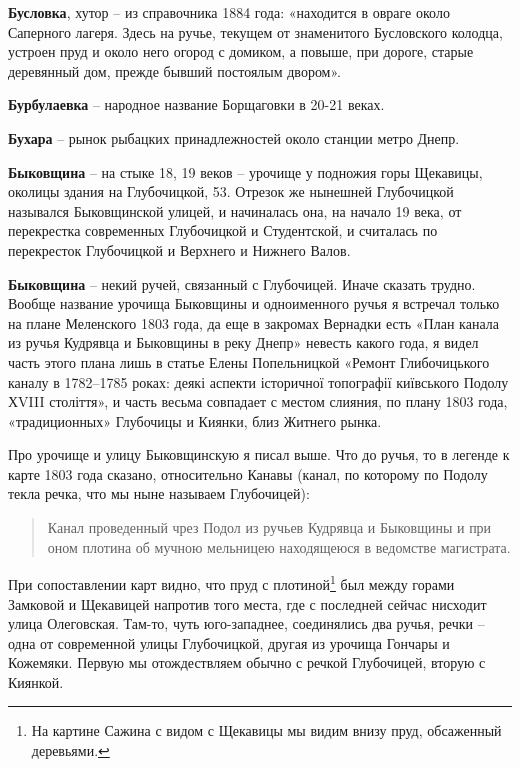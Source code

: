 \medskip

\textbf{Бусловка}, хутор – из справочника 1884 года: «находится в овраге около Саперного лагеря. Здесь на ручье, текущем от знаменитого Бусловского колодца, устроен пруд и около него огород с домиком, а повыше, при дороге, старые деревянный дом, прежде бывший постоялым двором».\\
\medskip


\textbf{Бурбулаевка} – народное название Борщаговки в 20-21 веках.\\

\medskip


\textbf{Бухара} – рынок рыбацких принадлежностей около станции метро Днепр.\\

\medskip

\textbf{Быковщина} – на стыке 18, 19 веков – урочище у подножия горы Щекавицы, околицы здания на Глубочицкой, 53. Отрезок же нынешней Глубочицкой назывался Быковщинской улицей, и начиналась она, на начало 19 века, от перекрестка современных Глубочицкой и Студентской, и считалась по перекресток Глубочицкой и Верхнего и Нижнего Валов.\\

\medskip

\textbf{Быковщина} – некий ручей, связанный с Глубочицей. Иначе сказать трудно. Вообще название урочища Быковщины и одноименного ручья я встречал только на плане Меленского 1803 года, да еще в закромах Вернадки есть «План канала из ручья Кудрявца и Быковщины в реку Днепр» невесть какого года, я видел часть этого плана лишь в статье Елены Попельницкой «Ремонт Глибочицького каналу в 1782–1785 роках: деякі аспекти історичної топографії київського Подолу ХVIII століття», и часть весьма совпадает с местом слияния, по плану 1803 года, «традиционных» Глубочицы и Киянки, близ Житнего рынка.

Про урочище и улицу Быковщинскую я писал выше. Что до ручья, то в легенде к карте 1803 года сказано, относительно Канавы (канал, по которому по Подолу текла речка, что мы ныне называем Глубочицей):

\begin{quotation}
Канал проведенный чрез Подол из ручьев Кудрявца и Быковщины и при оном плотина об мучною мельницею находящеюся в ведомстве магистрата.
\end{quotation}

При сопоставлении карт видно, что пруд с плотиной\footnote{На картине Сажина с видом с Щекавицы мы видим внизу пруд, обсаженный деревьями.} был между горами Замковой и Щекавицей напротив того места, где с последней сейчас нисходит улица Олеговская. Там-то, чуть юго-западнее, соединялись два ручья, речки – одна от современной улицы Глубочицкой, другая из урочища Гончары и Кожемяки. Первую мы отождествляем обычно с речкой Глубочицей, вторую с Киянкой.

